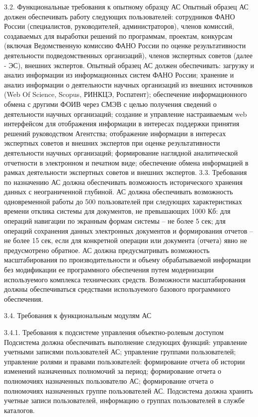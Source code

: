 3.2. Функциональные требования к опытному образцу АС 
Опытный образец АС должен обеспечивать работу следующих пользователей: сотрудников ФАНО России (специалистов, руководителей, администраторов), членов комиссий, создаваемых для выработки решений по программам, проектам, конкурсам (включая Ведомственную комиссию ФАНО России по оценке результативности деятельности подведомственных организаций), членов экспертных советов (далее - ЭС), внешних экспертов. 
Опытный образец АС должен обеспечивать:
загрузку и анализ информации из информационных систем ФАНО России;
хранение и анализ информации о деятельности научных организаций из внешних источников (Web Of Science, Scopus, РИНКЦЭ, Роспатент);
обеспечение информационного обмена с другими ФОИВ через СМЭВ с целью получения сведений о деятельности научных организаций;
создание и управление настраиваемым web интерфейсом для отображения информации в интересах поддержки принятия решений руководством Агентства;
отображение информации в интересах экспертных советов и внешних экспертов при оценке результативности деятельности научных организаций;
формирование наглядной аналитической отчетности в электронном и печатном виде;
обеспечение обмена информацией в рамках деятельности экспертных советов и внешних экспертов.
3.3. Требования по назначению
АС должна обеспечивать возможность исторического хранения данных с неограниченной глубиной.
АС должна обеспечивать возможность одновременной работы до 500 пользователей при следующих характеристиках времени отклика системы для документов, не превышающих  1000 Кб:
для операций навигации по экранным формам системы  – не более 5 сек;
для операций сохранения данных электронных документов и формирования отчетов  – не более 15 сек, если для конкретной операции или документа (отчета) явно не предусмотрено обратное.
АС должна предусматривать возможность масштабирования по производительности и объему обрабатываемой информации без модификации ее программного обеспечения путем модернизации используемого комплекса технических средств. Возможности масштабирования должны обеспечиваться средствами используемого базового программного обеспечения. 

3.4.  Требования к функциональным модулям АС 

3.4.1. Требования к  подсистеме управления объектно-ролевым доступом
Подсистема должна обеспечивать выполнение следующих функций:
управление учетными записями пользователей АС;
управление группами пользователей;
управление ролями и правами пользователей:
формирование отчета об истории изменений назначенных полномочий за период;
формирование отчета о полномочиях назначенных пользователю АС;
формирование отчета о полномочиях назначенных группе пользователей  АС.
Подсистема должна хранить учетные записи пользователей, информацию о группах пользователей  в службе каталогов.

